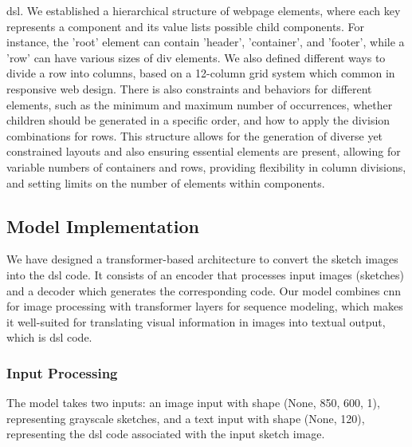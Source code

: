 \documentclass{ioereport}
\begin{document}
\gls{dsl}. We established a hierarchical structure of webpage
elements, where each key represents a component and its value lists possible child
components. For instance, the 'root' element can contain 'header', 'container', and
'footer', while a 'row' can have various sizes of div elements. We also defined different
ways to divide a row into columns, based on a 12-column grid system which common
in responsive web design. There is also constraints and behaviors for different elements,
such as the minimum and maximum number of occurrences, whether children should
be generated in a specific order, and how to apply the division combinations for rows.
This structure allows for the generation of diverse yet constrained layouts and also
ensuring essential elements are present, allowing for variable numbers of containers
and rows, providing flexibility in column divisions, and setting limits on the number of
elements within components.
\subsection{Model Implementation}
We have designed a transformer-based architecture to convert the sketch images into
the \gls{dsl} code. It consists of an encoder that processes input images (sketches) and a
decoder which generates the corresponding code. Our model combines \gls{cnn} for image processing with transformer layers for sequence
modeling, which makes it well-suited for translating visual information in images into
textual output, which is \gls{dsl} code.
\subsubsection{Input Processing}
The model takes two inputs: an image input with shape (None, 850, 600, 1),
representing grayscale sketches, and a text input with shape (None, 120), representing
the \gls{dsl} code associated with the input sketch image.
\end{document}
